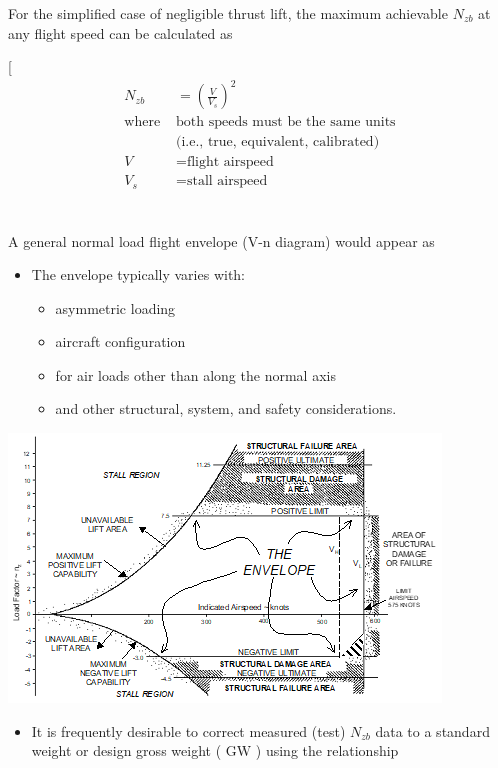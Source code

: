 \documentclass[
]{book}
\providecommand{\tightlist}{%
  \setlength{\itemsep}{0pt}\setlength{\parskip}{0pt}}
\begin{document}
For the simplified case of negligible thrust lift, the maximum achievable \(N_{zb}\) at any flight speed can be calculated as

{[}
\begin{align}
  N_{zb} &= \left( \frac{V}{V_s} \right)^2 \\
  \text{where } &\text{both speeds must be the same units} \\
  &\text{(i.e., true, equivalent, calibrated)} \\
  V &= \text{flight airspeed} \\
  V_s &= \text{stall airspeed} \\
  \end{align}~

A general normal load flight envelope (V-n diagram) would appear as

\begin{itemize}
\tightlist
\item
  The envelope typically varies with:

  \begin{itemize}
  \tightlist
  \item
    asymmetric loading
  \item
    aircraft configuration
  \item
    for air loads other than along the normal axis
  \item
    and other structural, system, and safety considerations.
  \end{itemize}
\end{itemize}

\includegraphics[width=4.52014in,height=2.81181in]{media/09/image3.png}

\begin{itemize}
\tightlist
\item
  It is frequently desirable to correct measured (test) \(N_{zb}\) data to a standard weight or design gross weight ( \(\mathrm{GW}\) ) using the relationship
\end{itemize}
\end{document}
